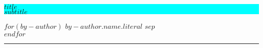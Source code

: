 %
%
%
% 

\thispagestyle{empty} %


\colorbox{cyan}{
	\parbox[t]{0.93\textwidth}{ %
		\parbox[t]{0.91\textwidth}{ %
			\raggedright %
			\fontsize{50pt}{80pt}\selectfont %
			\vspace{0.7cm} %
			
			$title$\\
			\fontsize{25pt}{40pt}\selectfont
			$subtitle$\\
			
			\vspace{0.7cm} %
		}
	}
}

\vfill %


\parbox[t]{0.93\textwidth}{ %
	\raggedleft %
	\large %
$for(by-author)$%
{\Large $by-author.name.literal$}%
$sep$\\ %
$endfor$%
	
	\hfill\rule{0.2\linewidth}{1pt}%
}
